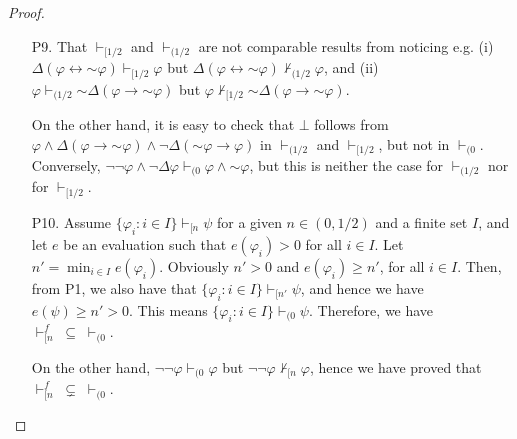 \documentclass[10pt,a4paper]{amsart}
\newcommand{\ninv}{\mathord{\sim}}
\begin{document}
\begin{proof}
\begin{enumerate}
(ii) $\varphi \land \ninv \varphi \not\vdash_{[n} \Delta(\varphi \leftrightarrow \ninv \varphi)$

Notice that $e(\varphi \land \ninv \varphi) \geq 1/2$ iff $e(\varphi) = 1/2$ iff $e(\varphi \leftrightarrow \ninv \varphi) = 1$, while if $e(\varphi) = n$, then $e(\varphi \land \ninv \varphi) = e(\varphi \leftrightarrow \ninv \varphi) = n$, but $e(\Delta(\varphi \leftrightarrow \ninv \varphi)) = 0$.   



\item[P9.]  That $\vdash_{[1/2}$ and $\vdash_{(1/2}$ are not comparable results from noticing e.g. (i) $\Delta(\varphi \leftrightarrow \ninv \varphi) \vdash_{[1/2} \varphi$ but $\Delta(\varphi \leftrightarrow \ninv \varphi) \nvdash_{(1/2} \varphi$, and (ii)
$\varphi \vdash_{(1/2} \ninv \Delta(\varphi \to \ninv \varphi)$ but $\varphi \nvdash_{[1/2} \ninv \Delta(\varphi \to \ninv \varphi)$.

On the other hand, it is easy to check that $\bot$ follows from $\varphi \land \Delta(\varphi \to \ninv \varphi) \land \neg \Delta (\ninv \varphi \to \varphi)$ in $\vdash_{(1/2}$ and $\vdash_{[1/2}$, but not in $\vdash_{(0}$. Conversely, 
$\neg\neg \varphi \land \neg \Delta \varphi  
\vdash_{(0} \varphi \land \ninv \varphi$, but this is neither the case for $\vdash_{(1/2}$ nor for $\vdash_{[1/2}$. 


\item[P10.]  Assume $\{\varphi_i :  i \in I\} \vdash_{[n} \psi$ for a given $n  \in (0, 1/2)$ and a finite set $I$, and let $e$ be an evaluation such that $e(\varphi_i) > 0 $ for all $i \in I$. 
Let $n' = \min_{i \in I} e(\varphi_i)$. Obviously $n' > 0$ and $e(\varphi_i) \geq n'$, for all $i \in I$. Then, from P1, we also have that $\{\varphi_i :  i \in I\} \vdash_{[n'} \psi$, and hence we have $e(\psi) \geq n' > 0$.  This means $\{\varphi_i :  i \in I\} \vdash_{(0} \psi$. Therefore, we have $\vdash^f_{[n}  \; \subseteq  \; \vdash_{(0}$.

On the other hand, $\neg \neg\varphi \vdash_{(0}  \varphi$ but  $\neg \neg\varphi \nvdash_{[n}  \varphi$, hence we have proved that $\vdash^f_{[n}  \; \varsubsetneq  \; \vdash_{(0}$.
\end{enumerate}
\end{proof}
\end{document}
